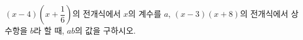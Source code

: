 $(x-4)\left(x+\dfrac{1}{6}\right)$의 전개식에서 $x$의 계수를 $a$, $(x-3)(x+8)$의 전개식에서 상수항을 $b$라 할 때, $ab$의 값을 구하시오.
